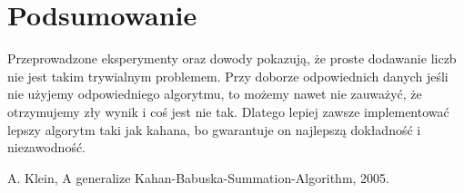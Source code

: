 \documentclass[11pt, wide]{article}
\begin{document}
    \section{Podsumowanie}
    Przeprowadzone eksperymenty oraz dowody pokazują, że proste dodawanie liczb
    nie jest takim trywialnym problemem. Przy doborze odpowiednich danych jeśli nie użyjemy odpowiedniego algorytmu, to możemy nawet nie zauważyć, że
    otrzymujemy zły wynik i coś jest nie tak. Dlatego lepiej zawsze implementować lepszy algorytm taki jak kahana, bo
    gwarantuje on najlepszą dokładność i niezawodność.
\begin{thebibliography}{9}
    \itemsep2pt
     A. Klein, A generalize Kahan-Babuska-Summation-Algorithm, 2005.
\end{thebibliography}    
\end{document}
